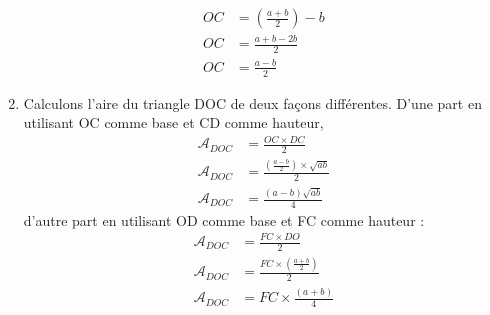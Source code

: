 \documentclass[11pt]{article}
\begin{document}
\begin{enumerate}
\begin{align*}
	OC &= \left( \frac{a + b}{2} \right) - b\\
	OC &= \frac{a + b - 2b}{2}\\
	OC &= \frac{a - b}{2}
\end{align*}
\item Calculons l'aire du triangle DOC de deux façons différentes. 
D'une part en utilisant OC comme base et CD comme hauteur, 
\begin{align*}
	\mathcal{A}_{DOC} &= \frac{OC\times DC}{2}\\
	\mathcal{A}_{DOC} &= \frac{\left(\frac{a - b}{2}\right)\times \sqrt{ab}}{2} \\
	\mathcal{A}_{DOC} &= \frac{(a - b)\sqrt{ab}}{4}
\end{align*}
d'autre part en utilisant OD comme base et FC comme hauteur :
\begin{align*}
	\mathcal{A}_{DOC} &= \frac{FC\times DO}{2}\\
	\mathcal{A}_{DOC} &= \frac{FC\times \left(\frac{a + b}{2}\right)}{2} \\
	\mathcal{A}_{DOC} &= FC\times \frac{(a + b)}{4}
\end{align*}


\end{enumerate}
\end{document}

